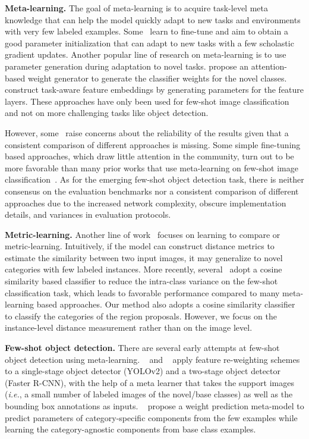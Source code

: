 \documentclass{article}
\newcommand\minisection[1]{\vspace{1mm}\noindent \textbf{#1}}
\begin{document}
\minisection{Meta-learning.} The goal of meta-learning is to acquire task-level meta knowledge that
can help the model quickly adapt to new tasks and environments with very few labeled examples.  Some~\cite{finn2017model,rusu2018meta,nichol2018reptile} learn to fine-tune and aim to obtain a good parameter initialization that can adapt to
new tasks with a few scholastic gradient updates. Another popular line of research on meta-learning is to use parameter generation during adaptation to novel tasks. \citet{gidaris2018dynamic} propose an attention-based weight generator to generate the classifier weights for the novel classes. \citet{wang2019tafe} construct task-aware feature embeddings by generating parameters for the feature layers. These approaches have only been used for few-shot image 
classification and not on more challenging tasks like object detection.

However, some~\cite{chen2019closer} 
raise concerns about the reliability of the results given 
that a consistent comparison of different approaches is missing. 
Some simple fine-tuning based approaches, which draw little attention in the
community, turn out to be more favorable than many prior works that use meta-learning
on few-shot image classification~\cite{chen2019closer,dhillon2019baseline}.
As for the emerging few-shot object detection task, there is neither consensus on the evaluation benchmarks nor a consistent comparison of different approaches due to the increased network complexity, obscure implementation details, and variances in evaluation protocols.

\minisection{Metric-learning.} Another line of work~\cite{koch2015siamese,snell2017prototypical,vinyals2016matching}
focuses on learning to compare or metric-learning. Intuitively, if the model can construct distance metrics to 
estimate the similarity between two input images, it may generalize to 
novel categories with few labeled instances. More recently, several~\cite{chen2019closer,gidaris2018dynamic,qi2018low} adopt a 
cosine similarity based classifier to reduce the intra-class variance on the few-shot classification task, which leads to favorable performance compared to many 
meta-learning based approaches. Our method also adopts a cosine
similarity classifier to classify the categories of the region proposals. However, we focus on the instance-level distance measurement rather than on the image level.

\minisection{Few-shot object detection.} There are several early attempts 
at few-shot object detection using meta-learning. ~\citet{kang2019few} and 
~\citet{yan2019meta} apply feature re-weighting schemes to a
single-stage object detector (YOLOv2) and a two-stage object detector
(Faster R-CNN), with the help of a meta learner that takes the support images (\textit{i.e.}, a small number of labeled images of the novel/base classes) 
as well as the bounding box annotations as inputs. ~\citet{wang2019meta} 
propose a weight prediction meta-model to predict parameters of
category-specific components from the few examples while learning the category-agnostic components from base class examples. 
\end{document}
